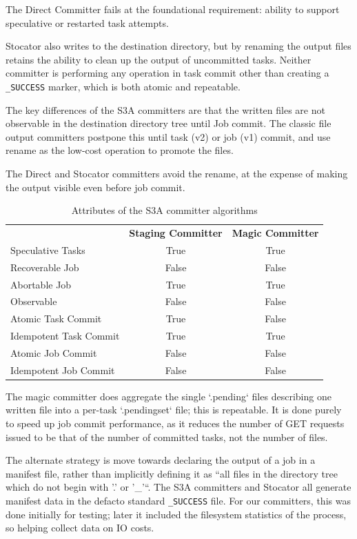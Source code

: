 \documentclass[9pt,technote]{IEEEtran}
\begin{document}
The Direct Committer fails at the foundational requirement: ability to support
speculative or restarted task attempts.

Stocator also writes to the destination directory, but by renaming the output
files retains the ability to clean up the output of uncommitted tasks.
Neither committer is performing any operation in task commit other than creating
a \texttt{\_SUCCESS} marker, which is both atomic and repeatable.


The key differences of the S3A committers are that the written files are
not observable in the destination directory tree until Job commit.
The classic file output committers postpone this until task (v2) or job (v1)
commit, and use rename as the low-cost operation to promote the files.


The Direct and Stocator committers avoid the rename, at the expense of making
the output visible even before job commit.

\begin{table}
  \label{tab:s3a-committer-attributes}
  \begin{tabular}{ l c c }
    \hline
    & \textbf{Staging Committer} & \textbf{Magic Committer} \\
    Speculative Tasks & True & True \\
    Recoverable Job & False & False \\
    Abortable Job & True & True \\
    Observable & False & False \\
    Atomic Task Commit & True & False \\
    Idempotent Task Commit & True & True \\
    Atomic Job Commit & False & False \\
    Idempotent Job Commit & False & False \\
    \hline
  \end{tabular}
  \caption{Attributes of the S3A committer algorithms}
\end{table}


The magic committer does aggregate the single `.pending` files describing
one written file into a per-task `.pendingset` file;
this is repeatable.
It is done purely to speed up job commit performance, as it reduces the
number of GET requests issued to be that of the number of committed tasks,
not the number of files.


The alternate strategy is move towards declaring the output of a job in
a manifest file, rather than implicitly defining it as ``all files in the directory
tree which do not begin with '.' or '_'``.
The S3A committers and Stocator all generate manifest data in the defacto
standard \texttt{\_SUCCESS} file.
For our committers, this was done initially for testing;
later it included the filesystem statistics of the process, so helping
collect data on IO costs.
\end{document}
